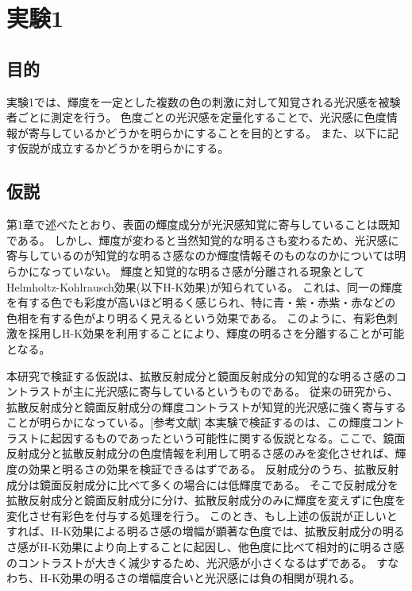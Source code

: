 \chapter{実験1}

\section{目的}

    実験1では、輝度を一定とした複数の色の刺激に対して知覚される光沢感を被験者ごとに測定を行う。
    色度ごとの光沢感を定量化することで、光沢感に色度情報が寄与しているかどうかを明らかにすることを目的とする。
    また、以下に記す仮説が成立するかどうかを明らかにする。

\section{仮説}

    第1章で述べたとおり、表面の輝度成分が光沢感知覚に寄与していることは既知である。
    しかし、輝度が変わると当然知覚的な明るさも変わるため、光沢感に寄与しているのが知覚的な明るさ感なのか輝度情報そのものなのかについては明らかになっていない。
    輝度と知覚的な明るさ感が分離される現象としてHelmholtz-Kohlrausch効果(以下H-K効果)が知られている。
    これは、同一の輝度を有する色でも彩度が高いほど明るく感じられ、特に青・紫・赤紫・赤などの色相を有する色がより明るく見えるという効果である。
    このように、有彩色刺激を採用しH-K効果を利用することにより、輝度の明るさを分離することが可能となる。

    本研究で検証する仮説は、拡散反射成分と鏡面反射成分の知覚的な明るさ感のコントラストが主に光沢感に寄与しているというものである。
    従来の研究から、拡散反射成分と鏡面反射成分の輝度コントラストが知覚的光沢感に強く寄与することが明らかになっている。[参考文献]
    本実験で検証するのは、この輝度コントラストに起因するものであったという可能性に関する仮説となる。ここで、鏡面反射成分と拡散反射成分の色度情報を利用して明るさ感のみを変化させれば、輝度の効果と明るさの効果を検証できるはずである。
    反射成分のうち、拡散反射成分は鏡面反射成分に比べて多くの場合には低輝度である。
    そこで反射成分を拡散反射成分と鏡面反射成分に分け、拡散反射成分のみに輝度を変えずに色度を変化させ有彩色を付与する処理を行う。
    このとき、もし上述の仮説が正しいとすれば、H-K効果による明るさ感の増幅が顕著な色度では、拡散反射成分の明るさ感がH-K効果により向上することに起因し、他色度に比べて相対的に明るさ感のコントラストが大きく減少するため、光沢感が小さくなるはずである。
    すなわち、H-K効果の明るさの増幅度合いと光沢感には負の相関が現れる。

